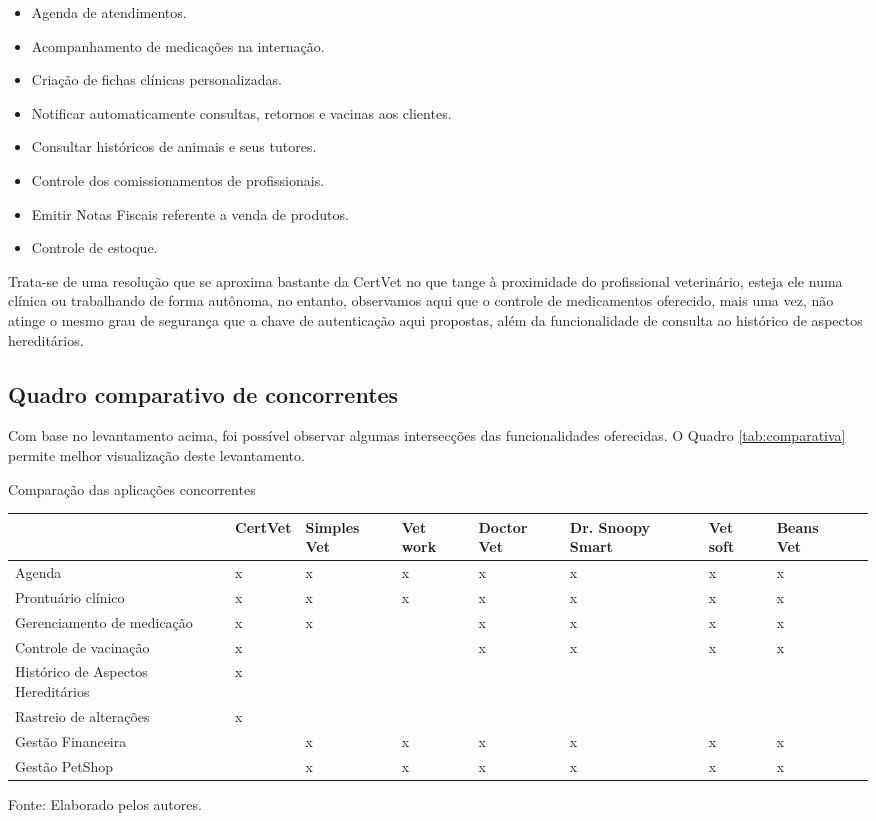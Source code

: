 \documentclass[
    12pt,               %
    openright,          %
    oneside,
    a4paper,            %
    BIBLATEX,           %
    TODO,               %
    english,            %
    brazil              %
    ]{ifsp-spo-inf-ctds}
\begin{document}
\begin{itemize}
    \item Agenda de atendimentos.
    \item Acompanhamento de medicações na internação.
    \item Criação de fichas clínicas personalizadas.
    \item Notificar automaticamente consultas, retornos e vacinas aos clientes.
    \item Consultar históricos de animais e seus tutores.
    \item Controle dos comissionamentos de profissionais.
    \item Emitir Notas Fiscais referente a venda de produtos.
    \item Controle de estoque.
\end{itemize}

    Trata-se de uma resolução que se aproxima bastante da CertVet no que tange à proximidade do profissional veterinário, esteja ele numa clínica ou trabalhando de forma autônoma, no entanto, observamos aqui que o controle de medicamentos oferecido, mais uma vez, não atinge o mesmo grau de segurança que a chave de autenticação aqui propostas, além da funcionalidade de consulta ao histórico de aspectos hereditários.

    \subsection{Quadro comparativo de concorrentes}
    Com base no levantamento acima, foi possível observar algumas intersecções das funcionalidades oferecidas. O Quadro \ref{tab:comparativa} permite melhor visualização deste levantamento.

    \begin{center}
    \begin{quadro}[H]
     \caption{Comparação das aplicações concorrentes}
    \label{tab:comparativa}
    \begin{tabulary}{1.0\textwidth}{|L|L|L|L|L|L|L|L|L|}
    \hline
     & CertVet & Simples Vet & Vet work & Doctor Vet & Dr. Snoopy Smart & Vet soft & Beans Vet\\
    \hline
    Agenda & x & x & x & x & x & x & x\\
    \hline
    Prontuário clínico & x & x & x & x & x & x & x\\
    \hline
    Gerenciamento de medicação & x & x &  & x & x & x & x\\
    \hline
    Controle de vacina\c{c}ão & x &  &  & x & x & x & x\\
    \hline
    Histórico de Aspectos Hereditários & x &  &  &  &  &  & \\
    \hline
    Rastreio de alterações & x &  &  &  &  &  & \\
    \hline
    Gestão Financeira &  & x & x & x & x & x & x\\
    \hline
    Gestão PetShop &  & x & x & x & x & x & x\\
    \hline
    \end{tabulary}
    \centering
    {\footnotesize Fonte: Elaborado pelos autores.}
    \end{quadro}
\end{center}
\end{document}
